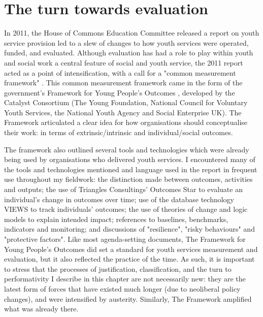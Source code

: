 \section{The turn towards evaluation}
\label{sec:6-2-turn-towards}
In 2011, the House of Commons Education Committee released a report on youth service provision led to a slew of changes to how youth services were operated, funded, and evaluated. Although evaluation has had a role to play within youth and social work a central feature of social and youth service, the 2011 report acted as a point of intensification, with a call for a "common measurement framework" \citet[4]{house_of_commons_education_committee_services_2011}. This common measurement framework came in the form of the government's Framework for Young People's Outcomes \citep{mcneil_framework_2012}, developed by the Catalyst Consortium (The Young Foundation, National Council for Voluntary Youth Services, the National Youth Agency and Social Enterprise UK). The Framework articulated a clear idea for how organisations should conceptualise their work: in terms of extrinsic/intrinsic and individual/social outcomes.

The framework also outlined several tools and technologies which were already being used by organisations who delivered youth services. I encountered many of the tools and technologies mentioned and language used in the report in frequent use throughout my fieldwork: the distinction made between outcomes, activities and outputs; the use of Triangles Consultings' Outcomes Star to evaluate an individual's change in outcomes over time; use of the database technology VIEWS to track individuals' outcomes; the use of theories of change and logic models to explain intended impact; references to baselines, benchmarks, indicators and monitoring; and discussions of "resilience", "risky behaviours" and "protective factors". Like most agenda-setting documents, The Framework for Young People's Outcomes did set a standard for youth services measurement and evaluation, but it also reflected the practice of the time. As such, it is important to stress that the processes of justification, classification, and the turn to performativity I describe in this chapter are not necessarily new: they are the latest form of forces that have existed much longer (due to neoliberal policy changes), and were intensified by austerity. Similarly, The Framework amplified what was already there. 

